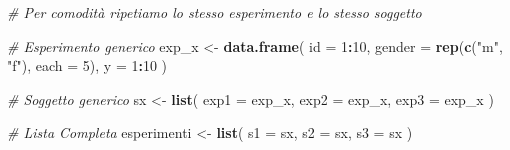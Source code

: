 \documentclass[
]{book}
\newenvironment{Shaded}{\begin{snugshade}}{\end{snugshade}}
\newcommand{\CommentTok}[1]{\textcolor[rgb]{0.56,0.35,0.01}{\textit{#1}}}
\newcommand{\DataTypeTok}[1]{\textcolor[rgb]{0.13,0.29,0.53}{#1}}
\newcommand{\DecValTok}[1]{\textcolor[rgb]{0.00,0.00,0.81}{#1}}
\newcommand{\KeywordTok}[1]{\textcolor[rgb]{0.13,0.29,0.53}{\textbf{#1}}}
\newcommand{\NormalTok}[1]{#1}
\newcommand{\OperatorTok}[1]{\textcolor[rgb]{0.81,0.36,0.00}{\textbf{#1}}}
\newcommand{\StringTok}[1]{\textcolor[rgb]{0.31,0.60,0.02}{#1}}
\begin{document}
\begin{Shaded}
\begin{Highlighting}[]
\CommentTok{# Per comodità ripetiamo lo stesso esperimento e lo stesso soggetto}

\CommentTok{# Esperimento generico}
\NormalTok{exp_x <-}\StringTok{ }\KeywordTok{data.frame}\NormalTok{(}
  \DataTypeTok{id =} \DecValTok{1}\OperatorTok{:}\DecValTok{10}\NormalTok{,}
  \DataTypeTok{gender =} \KeywordTok{rep}\NormalTok{(}\KeywordTok{c}\NormalTok{(}\StringTok{"m"}\NormalTok{, }\StringTok{"f"}\NormalTok{), }\DataTypeTok{each =} \DecValTok{5}\NormalTok{),}
  \DataTypeTok{y =} \DecValTok{1}\OperatorTok{:}\DecValTok{10}
\NormalTok{)}

\CommentTok{# Soggetto generico}
\NormalTok{sx <-}\StringTok{ }\KeywordTok{list}\NormalTok{(}
  \DataTypeTok{exp1 =}\NormalTok{ exp_x,}
  \DataTypeTok{exp2 =}\NormalTok{ exp_x,}
  \DataTypeTok{exp3 =}\NormalTok{ exp_x}
\NormalTok{)}

\CommentTok{# Lista Completa}
\NormalTok{esperimenti <-}\StringTok{ }\KeywordTok{list}\NormalTok{(}
  \DataTypeTok{s1 =}\NormalTok{ sx,}
  \DataTypeTok{s2 =}\NormalTok{ sx,}
  \DataTypeTok{s3 =}\NormalTok{ sx}
\NormalTok{)}


\end{Highlighting}
\end{Shaded}
\end{document}
